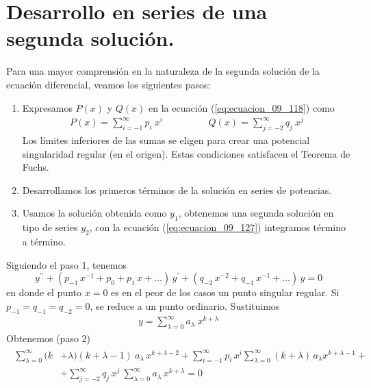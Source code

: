 \section{Desarrollo en series de una segunda solución.}
Para una mayor comprensión en la naturaleza de la segunda solución de la ecuación diferencial, veamos los siguientes pasos:
\begin{enumerate}
\item Expresamos $P(x)$ y $Q(x)$ en la ecuación (\ref{eq:ecuacion_09_118}) como
\begin{align}
P(x) = \sum_{i=-1}^{\infty} p_{i} \: x^{i} \hspace{2cm} Q(x) = \sum_{j=-2}^{\infty} q_{j} \: x^{j}
\label{eq:ecuacion_09_129}
\end{align}
Los límites inferiores de las sumas se eligen para crear una potencial singularidad regular (en el origen). Estas condiciones satisfacen el Teorema de Fuchs.
\item Desarrollamos los primeros términos de la solución en series de potencias.
\item Usamos la solución obtenida como $y_{1}$, obtenemos una segunda solución en tipo de series $y_{2}$, con la ecuación (\ref{eq:ecuacion_09_127}) integramos término a término.
\end{enumerate}
Siguiendo el paso 1, tenemos
\begin{equation}
y^{\prime \prime} + (p_{-1} \, x^{-1} + p_{0} + p_{1} \, x + \ldots) \, y^{\prime} + (q_{-2} \, x^{-2} + q_{-1} \, x^{-1} + \ldots) \, y = 0
\label{eq:ecuacion_09_130}
\end{equation}
en donde el punto $x = 0$ es en el peor de los casos un punto singular regular. Si $p_{-1} = q_{-1} = q_{-2} = 0$, se reduce a un punto ordinario. Sustituimos
\begin{align*}
y = \sum_{\lambda = 0}^{\infty} a_{\lambda} \: x^{k + \lambda}
\end{align*}
Obtenemos (paso 2)
\begin{align}
\begin{aligned}
\sum_{\lambda=0}^{\infty} (k &+ \lambda)(k + \lambda - 1) \: a_{\lambda} \, x^{k + \lambda - 2} + \sum_{i=-1}^{\infty} p_{i} \, x^{i} \sum_{\lambda=0}^{\infty} (k + \lambda) \,  a_{\lambda} x^{k + \lambda - 1} + \\
&+ \sum_{j=-2}^{\infty} q_{j} \, x^{j} \: \sum_{\lambda=0}^{\infty} a_{\lambda} \, x^{k + \lambda} = 0
\end{aligned}
\label{eq:ecuacion_09_131}
\end{align}
